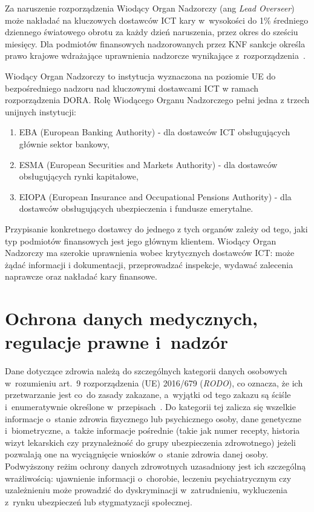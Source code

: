 Za naruszenie rozporządzenia Wiodący Organ Nadzorczy (ang \textit{Lead Overseer}) może nakładać na kluczowych dostawców ICT kary w~wysokości do 1\% średniego dziennego światowego obrotu za każdy dzień naruszenia, przez okres do sześciu miesięcy. Dla podmiotów finansowych nadzorowanych przez KNF sankcje określa prawo krajowe wdrażające uprawnienia nadzorcze wynikające z~rozporządzenia~\autocite{knf_dora}.

Wiodący Organ Nadzorczy to instytucja wyznaczona na poziomie UE do bezpośredniego nadzoru nad kluczowymi dostawcami ICT  w ramach rozporządzenia DORA.
Rolę Wiodącego Organu Nadzorczego pełni jedna z trzech unijnych instytucji:
\begin{enumerate}[label=(\roman*)]
  \item EBA (European Banking Authority) - dla dostawców ICT obsługujących głównie sektor bankowy,
\item ESMA (European Securities and Markets Authority) - dla dostawców obsługujących rynki kapitałowe,
\item EIOPA (European Insurance and Occupational Pensions Authority) - dla dostawców obsługujących ubezpieczenia i fundusze emerytalne.
\end{enumerate}
Przypisanie konkretnego dostawcy do jednego z tych organów zależy od tego, jaki typ podmiotów finansowych jest jego głównym klientem.
Wiodący Organ Nadzorczy ma szerokie uprawnienia wobec krytycznych dostawców ICT: może żądać informacji i dokumentacji, przeprowadzać inspekcje, wydawać zalecenia naprawcze oraz nakładać kary finansowe.

\section{Ochrona danych medycznych, regulacje prawne i~nadzór}

Dane dotyczące zdrowia należą do szczególnych kategorii danych osobowych w~rozumieniu art.~9 rozporządzenia (UE) 2016/679 (\textit{RODO})\autocite{rodo}, co oznacza, że ich przetwarzanie jest co~do zasady zakazane, a~wyjątki od tego zakazu są ściśle i~enumeratywnie określone w~przepisach~\autocite{przewodnik_rodo_zdrowie}. Do kategorii tej zalicza się wszelkie informacje o~stanie zdrowia fizycznego lub psychicznego osoby, dane genetyczne i~biometryczne, a~także informacje pośrednie (takie jak numer recepty, historia wizyt lekarskich czy przynależność do grupy ubezpieczenia zdrowotnego)  jeżeli pozwalają one na wyciągnięcie wniosków o~stanie zdrowia danej osoby.
Podwyższony reżim ochrony danych zdrowotnych uzasadniony jest ich szczególną wrażliwością: ujawnienie informacji o~chorobie, leczeniu psychiatrycznym czy uzależnieniu może prowadzić do dyskryminacji w~zatrudnieniu, wykluczenia z~rynku ubezpieczeń lub stygmatyzacji społecznej.

